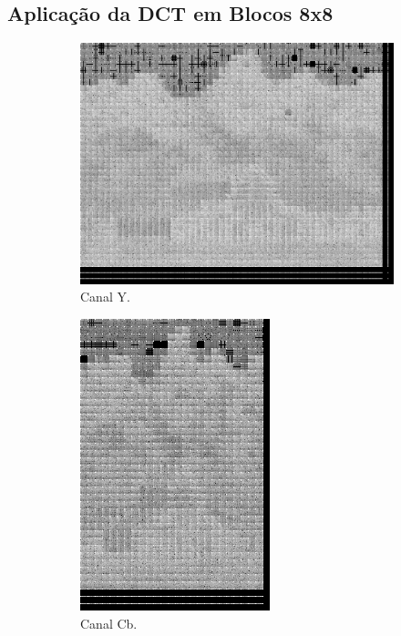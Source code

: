 \documentclass[a4paper, 12pt]{article}
\begin{document}
    \subsection{Aplicação da DCT em Blocos 8x8}
        \begin{figure}[H]
            \begin{subfigure}{0.3\textwidth}
                \centering
                \includegraphics[scale=0.5]{resources/DCT/Ydct8.png}
                \caption{ Canal Y.}
            \end{subfigure}
            \hfill
            \begin{subfigure}{0.3\textwidth}
                \centering 
                \includegraphics[scale=0.5]{resources/DCT/CBdct8.png}
                \caption{ Canal Cb.}
            \end{subfigure}
            \hfill
            \begin{subfigure}{0.3\textwidth}
                \centering

\end{subfigure}
\end{figure}
\end{document}

